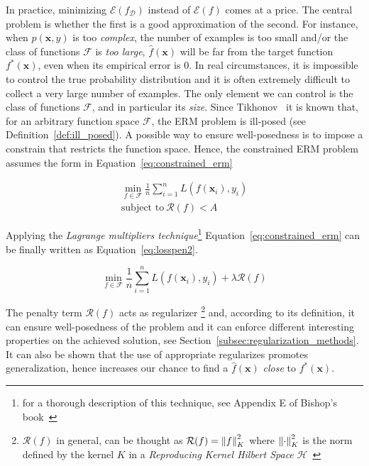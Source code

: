 In practice, minimizing $\mathcal{E}(f_{\mathcal{D}})$ instead of $\mathcal{E}(f)$ comes at a price. The central problem is whether the first is a good approximation of the second. For instance, when $p(\bm{x}, y)$ is too \textit{complex}, the number of examples is too small and/or the class of functions $\mathcal{F}$ is \textit{too large}, $\hat f(\bm{x})$ will be far from the target function $f^*(\bm{x})$, even when its empirical error is $0$. In real circumstances, it is impossible to control the true probability distribution and it is often extremely difficult to collect a very large number of examples. The only element we can control is the class of functions $\mathcal{F}$, and in particular its \textit{size}. Since Tikhonov~\cite{tikhonov1963solution} it is known that, for an arbitrary function space $\mathcal{F}$, the ERM problem is ill-posed (see Definition~\ref{def:ill_posed}). A possible way to ensure well-posedness is to impose a constrain that restricts the function space. Hence, the constrained ERM problem assumes the form in Equation~\eqref{eq:constrained_erm}

\begin{equation} \label{eq:constrained_erm}
	\begin{aligned}
		\min_{f \in \mathcal{F}}{\frac{1}{n} \sum_{i=1}^{n} L(f(\bm{x}_i), y_i)} \\
		\text{subject to}~\mathcal{R}(f) < A
	\end{aligned}
\end{equation}

Applying the \textit{Lagrange multipliers technique}\footnote{for a thorough description of this technique, see Appendix E of Bishop's book~\cite{bishop2006pattern}} Equation~\eqref{eq:constrained_erm} can be finally written as Equation~\eqref{eq:losspen2}.

\begin{equation} \label{eq:losspen2}
	\min_{f \in \mathcal{F}}{\frac{1}{n} \sum_{i=1}^{n} L(f(\bm{x}_i), y_i)} + \lambda \mathcal{R}(f)
\end{equation}

The penalty term $\mathcal{R}(f)$ acts as regularizer \footnote{$\mathcal{R}(f)$ in general, can be thought as $\mathcal{R}(f) = \left\lVert f\right\rVert^2_K$ where $\left\lVert\cdot\right\rVert^2_K$ is the norm defined by the kernel $K$ in a \textit{Reproducing Kernel Hilbert Space} $\mathcal{H}$~\cite{evgeniou2000regularization}}
and, according to its definition, it can ensure well-posedness of the problem and it can enforce different interesting properties on the achieved solution, see Section~\ref{subsec:regularization_methods}. It can also be shown that the use of appropriate regularizes promotes generalization, hence increases our chance to find a $\hat f(\bm{x})$ \textit{close} to $f^*(\bm{x})$.

